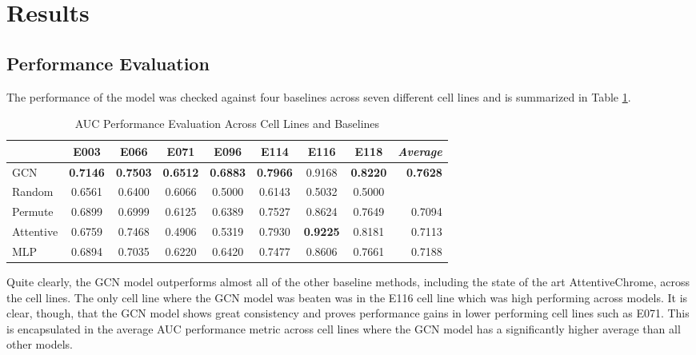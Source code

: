 \section{Results}
\subsection{Performance Evaluation}
The performance of the model was checked against four baselines across seven different cell lines and is summarized in Table \ref{table:Table1}.
\begin{table}[h]
    \centering
    \begin{tabular}{l || c | c | c | c | c | c | c || r}
        & E003 & E066 & E071 & E096 & E114 & E116 & E118 & \emph{Average}\\ \hline
        GCN & \textbf{0.7146} & \textbf{0.7503} & \textbf{0.6512} & \textbf{0.6883} & \textbf{0.7966} & 0.9168 & \textbf{0.8220} & \textbf{0.7628} \\
        Random & 0.6561 & 0.6400 & 0.6066 & 0.5000 & 0.6143 & 0.5032 & 0.5000 & \\
        Permute & 0.6899 & 0.6999 & 0.6125 & 0.6389 & 0.7527 & 0.8624 & 0.7649 & 0.7094 \\
        Attentive & 0.6759 & 0.7468 & 0.4906 & 0.5319 & 0.7930 & \textbf{0.9225} & 0.8181 & 0.7113 \\
        MLP & 0.6894 & 0.7035 & 0.6220 & 0.6420 & 0.7477 & 0.8606 & 0.7661 & 0.7188 



    \end{tabular}
    \caption{AUC Performance Evaluation Across Cell Lines and Baselines}
    \label{table:Table1}
\end{table}
Quite clearly, the GCN model outperforms almost all of the other baseline methods, including the state of the art AttentiveChrome, across the cell lines. The only cell line where the GCN model was beaten was in the E116 cell line which was high performing across models. It is clear, though, that the GCN model shows great consistency and proves performance gains in lower performing cell lines such as E071. This is encapsulated in the average AUC performance metric across cell lines where the GCN model has a significantly higher average than all other models. 